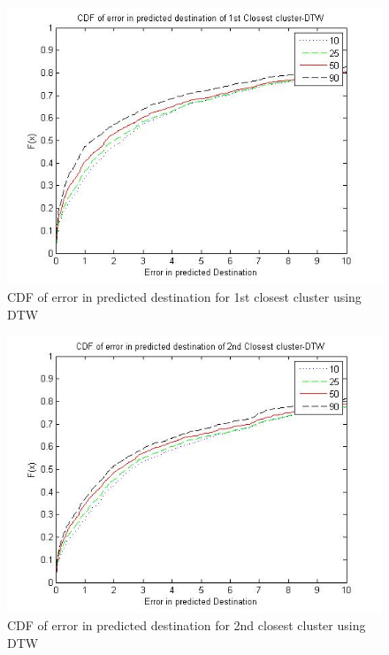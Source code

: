 \begin{figure}
\centering   
\includegraphics[scale=0.4]{figs/dtw_top.jpg}
\caption{CDF of error in predicted destination for 1st closest cluster using DTW}
\label{fig:dtw_top}  
\end{figure}

\begin{figure}
\centering   
\includegraphics[scale=0.4]{figs/dtw_top2.jpg}
\caption{CDF of error in predicted destination for 2nd closest cluster using DTW}
\label{fig:dtw_top2}  
\end{figure}

